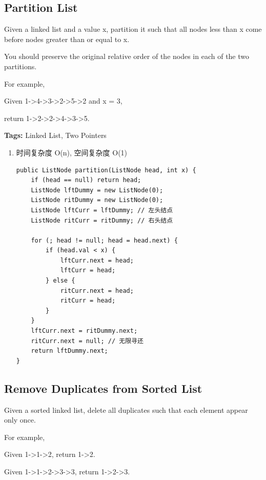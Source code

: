 \documentclass[12pt]{book}
\begin{document}
\subsection{Partition List}
\label{sec-3-2-3}

Given a linked list and a value x, partition it such that all nodes less than x come before nodes greater than or equal to x.

You should preserve the original relative order of the nodes in each of the two partitions.

For example,

Given 1->4->3->2->5->2 and x = 3,

return 1->2->2->4->3->5.

\textbf{Tags:} Linked List, Two Pointers

\begin{enumerate}
\item 时间复杂度 O(n), 空间复杂度 O(1)
\label{sec-3-2-3-1}

\lstset{language=java,label= ,caption= ,numbers=none}
\begin{lstlisting}
public ListNode partition(ListNode head, int x) {
    if (head == null) return head;
    ListNode lftDummy = new ListNode(0);
    ListNode ritDummy = new ListNode(0);
    ListNode lftCurr = lftDummy; // 左头结点
    ListNode ritCurr = ritDummy; // 右头结点

    for (; head != null; head = head.next) {
        if (head.val < x) {
            lftCurr.next = head;
            lftCurr = head;
        } else {
            ritCurr.next = head;
            ritCurr = head;
        }
    }
    lftCurr.next = ritDummy.next;
    ritCurr.next = null; // 无限寻还
    return lftDummy.next;
}
\end{lstlisting}
\end{enumerate}

\subsection{Remove Duplicates from Sorted List}
\label{sec-3-2-4}
Given a sorted linked list, delete all duplicates such that each element appear only once.

For example,

Given 1->1->2, return 1->2.

Given 1->1->2->3->3, return 1->2->3.
\end{document}
